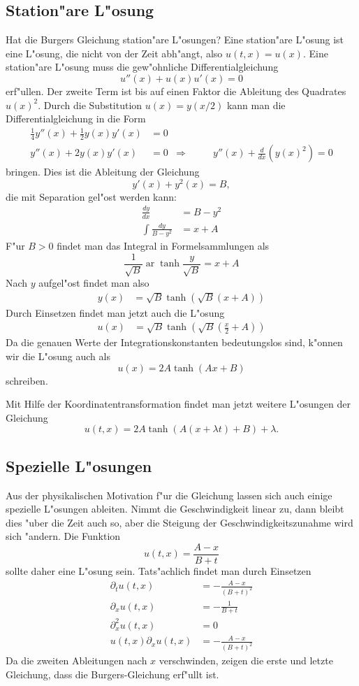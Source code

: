 \subsection{Station"are L"osung}
Hat die Burgers Gleichung station"are L"osungen? Eine station"are L"osung ist
eine L"osung, die nicht von der Zeit abh"angt, also
$u(t,x)=u(x)$.
Eine station"are L"osung muss die gew"ohnliche
Differentialgleichung
$$
u''(x)+u(x)u'(x)=0
$$
erf"ullen. Der zweite Term ist bis auf einen Faktor die Ableitung
des Quadrates $u(x)^2$. Durch die Substitution $u(x)=y(x/2)$ kann man
die Differentialgleichung in die Form
\begin{align*}
\frac14y''(x)+\frac12y(x)y'(x)&=0
\\
y''(x)+2y(x)y'(x)&=0&\Rightarrow&\qquad y''(x)+\frac{d}{dx}(y(x)^2)=0
\end{align*}
bringen.
Dies ist die Ableitung der Gleichung
$$y'(x)+y^2(x)=B,$$
die mit Separation gel"ost werden kann:
\begin{align*}
\frac{dy}{dx}&=B-y^2\\
\int\frac{dy}{B-y^2}&=x+A
\end{align*}
F"ur $B>0$  findet man das Integral in Formelsammlungen als
$$
\frac1{\sqrt{B}}\operatorname{ar}\tanh \frac{y}{\sqrt{B}}=x+A
$$
Nach $y$ aufgel"ost findet man also
\begin{align*}
y(x)&=\sqrt{B}\tanh(\sqrt{B}(x+A))
\end{align*}
Durch Einsetzen findet man jetzt auch die L"osung
\begin{align*}
u(x)&=
\sqrt{B}\tanh\left(\sqrt{B}\left(\frac{x}2+A\right)\right)
\end{align*}
Da die genauen Werte der Integrationskonstanten bedeutungslos sind, k"onnen
wir die L"osung auch als
$$u(x)= 2A \tanh (Ax+B) $$
schreiben.

Mit Hilfe der Koordinatentransformation findet man jetzt weitere L"osungen
der Gleichung
$$
u(t,x)=
2A \tanh (A(x+\lambda t)+B) +\lambda.
$$

\subsection{Spezielle L"osungen}
Aus der physikalischen Motivation f"ur die Gleichung lassen sich auch
einige spezielle L"osungen ableiten.
Nimmt die Geschwindigkeit linear zu, dann bleibt dies "uber die Zeit auch
so, aber die Steigung der Geschwindigkeitszunahme wird sich "andern.
Die Funktion
$$u(t,x)=\frac{A-x}{B+t}$$
sollte daher
eine L"osung sein. Tats"achlich findet man durch Einsetzen
\begin{align*}
\partial_t u(t,x)&=-\frac{A-x}{(B+t)^2}
\\
\partial_x u(t,x)&=-\frac{1}{B+t}
\\
\partial_x^2 u(t,x)&=0
\\
u(t,x)
\partial_xu(t,x)&=-\frac{A-x}{(B+t)^2}
\end{align*}
Da die zweiten Ableitungen nach $x$ verschwinden,
zeigen die erste und letzte Gleichung, dass die Burgers-Gleichung
erf"ullt ist.

